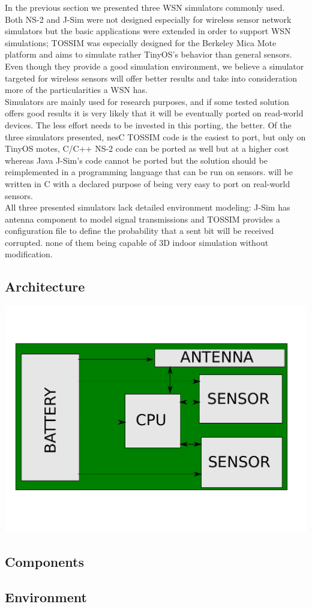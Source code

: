 In the previous section we presented three WSN simulators commonly used.
\\
    Both NS-2 and J-Sim were not designed especially for wireless 
sensor network simulators but the basic applications were extended
in order to support WSN simulations; TOSSIM was especially designed
for the Berkeley Mica Mote platform and aims to simulate rather TinyOS's behavior
than general sensors. Even though they provide a good simulation environment,
we believe a simulator targeted for wireless sensors will offer better results
and take into consideration more of the particularities a WSN has.
\\
    Simulators are mainly used for research purposes, and if some tested solution
offers good results it is very likely that it will be eventually ported on 
read-world devices. The less effort needs to be invested in this porting, the
better. Of the three simulators presented, nesC TOSSIM code is the easiest to port,
but only on TinyOS motes, C/C++ NS-2 code can be ported as well but at a higher
cost whereas Java J-Sim's code cannot be ported but the solution should be 
reimplemented in a programming language that can be run on sensors.
\codename will be written in C with a declared purpose of being very easy to port
on real-world sensors.
\\
All three presented simulators lack detailed environment modeling: J-Sim has 
antenna component to model signal transmissions and TOSSIM provides a configuration
file to define the probability that a sent bit will be received corrupted. 
 none of them
being capable of 3D indoor simulation without modification. 
\\

\subsection{Architecture}
\begin{center}
	\includegraphics[scale=0.6]{img/board.pdf}
\end{center}

\subsection{Components}
\subsection{Environment}

